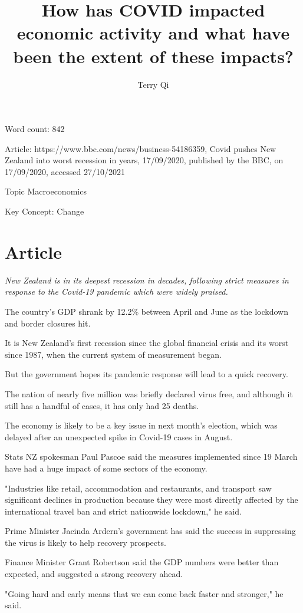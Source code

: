 \documentclass[a4paper,12pt]{article}
\title{How has COVID impacted economic activity and what have been the extent of these impacts?}
\author{Terry Qi}
\begin{document}
\maketitle
\newpage
Word count: 842

Article: https://www.bbc.com/news/business-54186359, Covid pushes New Zealand into worst recession in years, 17/09/2020, published by the BBC, on 17/09/2020, accessed 27/10/2021

Topic Macroeconomics

Key Concept: Change

\section*{Article}

\textit{New Zealand is in its deepest recession in decades, following strict measures in response to the Covid-19 pandemic which were widely praised.}

The country's GDP shrank by 12.2\% between April and June as the lockdown and border closures hit.

It is New Zealand's first recession since the global financial crisis and its worst since 1987, when the current system of measurement began.

But the government hopes its pandemic response will lead to a quick recovery.

The nation of nearly five million was briefly declared virus free, and although it still has a handful of cases, it has only had 25 deaths.

The economy is likely to be a key issue in next month's election, which was delayed after an unexpected spike in Covid-19 cases in August.

Stats NZ spokesman Paul Pascoe said the measures implemented since 19 March have had a huge impact of some sectors of the economy.

"Industries like retail, accommodation and restaurants, and transport saw significant declines in production because they were most directly affected by the international travel ban and strict nationwide lockdown," he said.

Prime Minister Jacinda Ardern's government has said the success in suppressing the virus is likely to help recovery prospects.

Finance Minister Grant Robertson said the GDP numbers were better than expected, and suggested a strong recovery ahead.

"Going hard and early means that we can come back faster and stronger," he said.
\end{document}
